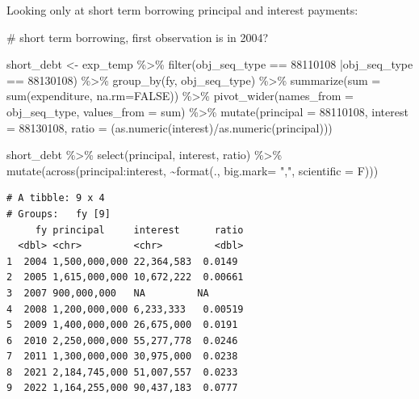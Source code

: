 \documentclass[
  letterpaper,
  DIV=11,
  numbers=noendperiod]{scrreport}
\newenvironment{Shaded}{\begin{snugshade}}{\end{snugshade}}
\newcommand{\AttributeTok}[1]{\textcolor[rgb]{0.40,0.45,0.13}{#1}}
\newcommand{\CommentTok}[1]{\textcolor[rgb]{0.37,0.37,0.37}{#1}}
\newcommand{\ConstantTok}[1]{\textcolor[rgb]{0.56,0.35,0.01}{#1}}
\newcommand{\DecValTok}[1]{\textcolor[rgb]{0.68,0.00,0.00}{#1}}
\newcommand{\FunctionTok}[1]{\textcolor[rgb]{0.28,0.35,0.67}{#1}}
\newcommand{\NormalTok}[1]{\textcolor[rgb]{0.00,0.23,0.31}{#1}}
\newcommand{\OtherTok}[1]{\textcolor[rgb]{0.00,0.23,0.31}{#1}}
\newcommand{\SpecialCharTok}[1]{\textcolor[rgb]{0.37,0.37,0.37}{#1}}
\newcommand{\StringTok}[1]{\textcolor[rgb]{0.13,0.47,0.30}{#1}}
\begin{document}
Looking only at short term borrowing principal and interest payments:

\begin{Shaded}
\begin{Highlighting}[]
\CommentTok{\# short term borrowing, first observation is in 2004?}

\NormalTok{short\_debt }\OtherTok{\textless{}{-}}\NormalTok{ exp\_temp }\SpecialCharTok{\%\textgreater{}\%} 
  \FunctionTok{filter}\NormalTok{(obj\_seq\_type }\SpecialCharTok{==} \DecValTok{88110108} \SpecialCharTok{|}\NormalTok{obj\_seq\_type }\SpecialCharTok{==} \DecValTok{88130108}\NormalTok{) }\SpecialCharTok{\%\textgreater{}\%} 
  \FunctionTok{group\_by}\NormalTok{(fy, obj\_seq\_type) }\SpecialCharTok{\%\textgreater{}\%} 
  \FunctionTok{summarize}\NormalTok{(}\AttributeTok{sum =} \FunctionTok{sum}\NormalTok{(expenditure, }\AttributeTok{na.rm=}\ConstantTok{FALSE}\NormalTok{)) }\SpecialCharTok{\%\textgreater{}\%} 
  \FunctionTok{pivot\_wider}\NormalTok{(}\AttributeTok{names\_from =}\NormalTok{ obj\_seq\_type, }\AttributeTok{values\_from =}\NormalTok{ sum) }\SpecialCharTok{\%\textgreater{}\%} 
  \FunctionTok{mutate}\NormalTok{(}\AttributeTok{principal =} \StringTok{\textasciigrave{}}\AttributeTok{88110108}\StringTok{\textasciigrave{}}\NormalTok{,}
         \AttributeTok{interest =} \StringTok{\textasciigrave{}}\AttributeTok{88130108}\StringTok{\textasciigrave{}}\NormalTok{,}
         \AttributeTok{ratio =}\NormalTok{ (}\FunctionTok{as.numeric}\NormalTok{(interest)}\SpecialCharTok{/}\FunctionTok{as.numeric}\NormalTok{(principal)))}

\NormalTok{short\_debt }\SpecialCharTok{\%\textgreater{}\%} \FunctionTok{select}\NormalTok{(principal, interest, ratio) }\SpecialCharTok{\%\textgreater{}\%}
  \FunctionTok{mutate}\NormalTok{(}\FunctionTok{across}\NormalTok{(principal}\SpecialCharTok{:}\NormalTok{interest, }\SpecialCharTok{\textasciitilde{}}\FunctionTok{format}\NormalTok{(., }\AttributeTok{big.mark=} \StringTok{","}\NormalTok{,  }\AttributeTok{scientific =}\NormalTok{ F)))}
\end{Highlighting}
\end{Shaded}

\begin{verbatim}
# A tibble: 9 x 4
# Groups:   fy [9]
     fy principal     interest      ratio
  <dbl> <chr>         <chr>         <dbl>
1  2004 1,500,000,000 22,364,583  0.0149 
2  2005 1,615,000,000 10,672,222  0.00661
3  2007 900,000,000   NA         NA      
4  2008 1,200,000,000 6,233,333   0.00519
5  2009 1,400,000,000 26,675,000  0.0191 
6  2010 2,250,000,000 55,277,778  0.0246 
7  2011 1,300,000,000 30,975,000  0.0238 
8  2021 2,184,745,000 51,007,557  0.0233 
9  2022 1,164,255,000 90,437,183  0.0777 
\end{verbatim}
\end{document}
